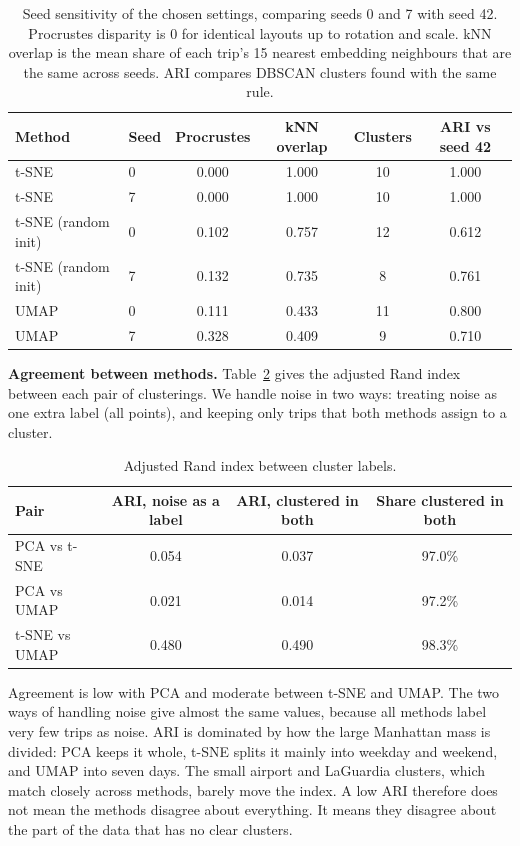 \documentclass{article}
\begin{document}
\begin{table}[!htbp]
  \caption{Seed sensitivity of the chosen settings, comparing seeds 0 and 7 with seed 42. Procrustes disparity is 0 for identical layouts up to rotation and scale. kNN overlap is the mean share of each trip's 15 nearest embedding neighbours that are the same across seeds. ARI compares DBSCAN clusters found with the same rule.}
  \label{tab:q6_seeds}
  \centering
  \small
  \begin{tabular}{llcccc}
    \toprule
    Method & Seed & Procrustes & kNN overlap & Clusters & ARI vs seed 42 \\
    \midrule
    t-SNE & 0 & 0.000 & 1.000 & 10 & 1.000 \\
    t-SNE & 7 & 0.000 & 1.000 & 10 & 1.000 \\
    t-SNE (random init) & 0 & 0.102 & 0.757 & 12 & 0.612 \\
    t-SNE (random init) & 7 & 0.132 & 0.735 & 8 & 0.761 \\
    UMAP & 0 & 0.111 & 0.433 & 11 & 0.800 \\
    UMAP & 7 & 0.328 & 0.409 & 9 & 0.710 \\
    \bottomrule
  \end{tabular}
\end{table}

\textbf{Agreement between methods.} Table~\ref{tab:q6_ari} gives the adjusted Rand index between each pair of clusterings. We handle noise in two ways: treating noise as one extra label (all points), and keeping only trips that both methods assign to a cluster.

\begin{table}[!htbp]
  \caption{Adjusted Rand index between cluster labels.}
  \label{tab:q6_ari}
  \centering
  \small
  \begin{tabular}{lccc}
    \toprule
    Pair & ARI, noise as a label & ARI, clustered in both & Share clustered in both \\
    \midrule
    PCA vs t-SNE & 0.054 & 0.037 & 97.0\% \\
    PCA vs UMAP & 0.021 & 0.014 & 97.2\% \\
    t-SNE vs UMAP & 0.480 & 0.490 & 98.3\% \\
    \bottomrule
  \end{tabular}
\end{table}

Agreement is low with PCA and moderate between t-SNE and UMAP. The two ways of handling noise give almost the same values, because all methods label very few trips as noise. ARI is dominated by how the large Manhattan mass is divided: PCA keeps it whole, t-SNE splits it mainly into weekday and weekend, and UMAP into seven days. The small airport and LaGuardia clusters, which match closely across methods, barely move the index. A low ARI therefore does not mean the methods disagree about everything. It means they disagree about the part of the data that has no clear clusters.
\end{document}
